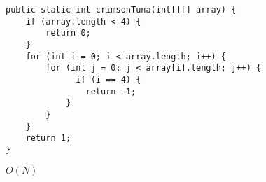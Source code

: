 \begin{blocksection}
\question
\begin{lstlisting}
public static int crimsonTuna(int[][] array) {
    if (array.length < 4) {
        return 0;
    }
    for (int i = 0; i < array.length; i++) {
        for (int j = 0; j < array[i].length; j++) {
              if (i == 4) {
                return -1;
            }
        }
    }
    return 1;
}
\end{lstlisting}

\begin{solution}
$O(N)$
\end{solution}
\end{blocksection}
